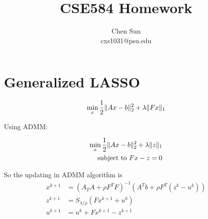 \documentclass{amsart}
\DeclarePairedDelimiter\norm{\lVert}{\rVert}%
\begin{document}
\title{CSE584 Homework}
\author{Chen Sun\\cxs1031@psu.edu}
\maketitle


\section{Generalized LASSO}
\begin{align*}
	\min\limits_{x} \frac{1}{2}\norm{Ax-b}_2^2 + \lambda\norm{Fx}_1
\end{align*}

Using ADMM:

\begin{align*}
	\min\limits_{x} \frac{1}{2}\norm{Ax-b}_2^2 + \lambda\norm{z}_1\\
	\text{subject to } Fx - z = 0
\end{align*}

So the updating in ADMM algorithm is 
\begin{align*}
	x^{k+1} &= (A_TA+\rho F^TF)^{-1}(A^Tb+\rho F^T(z^k-u^k))\\
	z^{k+1} &= S_{\lambda/\rho}(Fx^{k+1}+u^k)\\
	u^{k+1} &= u^k + Fx^{k+1} - z^{k+1}	
\end{align*}
\end{document}
